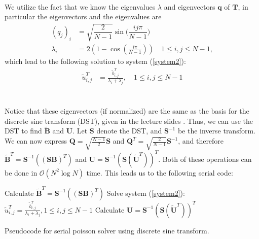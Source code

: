 \\
We utilize the fact that we know the eigenvalues $\lambda$ and eigenvectors $\mathbf{q}$ of $\mathbf{T}$, in particular the eigenvectors and the eigenvalues are
\begin{align*}
	(q_j)_i &= \sqrt{\dfrac{2}{N-1}}\sin \Big( \dfrac{ij\pi}{N-1}\Big) \\
	\lambda_i &= 2\left(1-\cos\left(\frac{i \pi}{N-1}\right) \right)\quad 1 \leq i, j \leq N-1,
\end{align*}
which lead to the following solution to system (\ref{system2}):
\begin{align*}
\tilde{u}^T_{i,j} &= \frac{\tilde{b}^T_{i,j}}{\lambda_i + \lambda_j},\quad 1 \leq i, j \leq N-1
\end{align*}
\\ \\
Notice that these eigenvectors (if normalized) are the same as the basis for the discrete sine transform (DST), given in the lecture slides \cite{forelesning}. Thus, we can use the DST to find $\mathbf{\widetilde{B}}$ and $\mathbf{U}$. Let $\mathbf{S}$ denote the DST, and $\mathbf{S}^{-1}$ be the inverse transform. We can now express $\mathbf{Q} = \sqrt{\frac{N-1}{2}}\mathbf{S}$ and $\mathbf{Q}^T = \sqrt{\frac{2}{N-1}}\mathbf{S}^{-1}$, and therefore $\mathbf{\widetilde{B}}^T = \mathbf{S}^{-1}((\mathbf{SB})^T)$ and $\mathbf{U} = \mathbf{S}^{-1}(\mathbf{S}(\mathbf{\widetilde{U}}^T))^T$. Both of these operations can be done in $\mathcal{O}(N^2\log{N})$ time. 
This leads us to the following serial code:\\

\begin{algorithm}[H]
 Calculate $\mathbf{\widetilde{B}}^T = \mathbf{S}^{-1}((\mathbf{SB})^T)$  \;
 Solve system (\ref{system2}): $\tilde{u}^T_{i,j} = \frac{\tilde{b}^T_{i,j}}{\lambda_i + \lambda_j}, 1 \leq i, j \leq N-1$\;
 Calculate $\mathbf{U} = \mathbf{S}^{-1}(\mathbf{S}(\mathbf{\widetilde{U}}^T))^T$ \;
 \caption{Pseudocode for serial poisson solver using discrete sine transform.}
 \label{code:serial}
\end{algorithm}